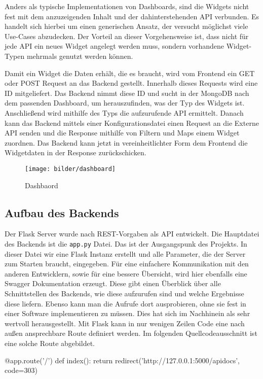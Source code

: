 Anders als typische Implementationen von Dashboards, sind die Widgets nicht fest mit dem anzuzeigenden Inhalt und der dahinterstehenden API verbunden. Es handelt sich hierbei um einen generischen Ansatz, der versucht möglichst viele Use-Cases abzudecken. Der Vorteil an dieser Vorgehensweise ist, dass nicht für jede API ein neues Widget angelegt werden muss, sondern vorhandene Widget-Typen mehrmals genutzt werden können.

Damit ein Widget die Daten erhält, die es braucht, wird vom Frontend ein GET oder POST Request an das Backend gestellt. Innerhalb dieses Requests wird eine ID mitgeliefert. Das Backend nimmt diese ID und sucht in der MongoDB nach dem passenden Dashboard, um herauszufinden, was der Typ des Widgets ist. Anschließend wird mithilfe des Typs die aufzurufende API ermittelt.  Danach kann das Backend mittels einer Konfigurationsdatei einen Request an die Externe API senden und die Response mithilfe von Filtern und Maps einem Widget zuordnen. Das Backend kann jetzt in vereinheitlichter Form dem Frontend die Widgetdaten in der Response zurückschicken. 

\begin{figure}[H]
  \centering
    \texttt{[image: bilder/dashboard]}
    \caption{Dashbaord}
\end{figure}

\subsection{Aufbau des Backends}
Der Flask Server wurde nach REST-Vorgaben als API entwickelt. Die Hauptdatei des Backends ist die \texttt{app.py} Datei. Das ist der Ausgangspunk des Projekts. In dieser Datei wir eine Flask Instanz erstellt und alle Parameter, die der Server zum Starten braucht, eingegeben. Für eine einfachere Kommunikation mit den anderen Entwicklern, sowie für eine bessere Übersicht, wird hier ebenfalls eine Swagger Dokumentation erzeugt. Diese gibt einen Überblick über alle Schnittstellen des Backends, wie diese aufzurufen sind und welche Ergebnisse diese liefern. Ebenso kann man die Aufrufe dort ausprobieren, ohne sie fest in einer Software implementieren zu müssen. Dies hat sich im Nachhinein als sehr wertvoll herausgestellt. Mit Flask kann in nur wenigen Zeilen Code eine nach außen ansprechbare Route definiert werden. Im folgenden Quellcodeausschnitt ist eine solche Route abgebildet. 

\begin{python}
@app.route('/')
def index():
	return redirect('http://127.0.0.1:5000/apidocs', code=303)
\end{python}

